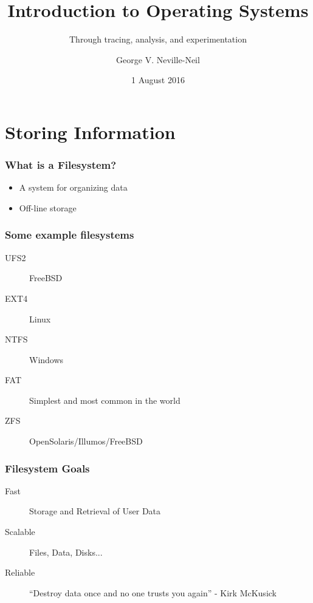\documentclass[pdftex]{beamer} %
\begin{document}

\title{Introduction to Operating Systems}
\subtitle{Through tracing, analysis, and experimentation}
\author{George V. Neville-Neil}
\date{1 August 2016}

\begin{frame}
  \titlepage
\end{frame}

\section{Storing Information}
\label{sec:storage}

\begin{frame}
  \frametitle{What is a Filesystem?}
  \begin{itemize}
  \item A system for organizing data
  \item Off-line storage
  \end{itemize}
\end{frame}

\begin{frame}
  \frametitle{Some example filesystems}
  \begin{description}
  \item[UFS2] FreeBSD
    \pause
    
  \item[EXT4] Linux
    
    \pause
    
  \item[NTFS] Windows

    \pause

  \item[FAT] Simplest and most common in the world

    \pause

  \item[ZFS] OpenSolaris/Illumos/FreeBSD
  \end{description}
\end{frame}

\begin{frame}
  \frametitle{Filesystem Goals}
  \begin{description}
  \item [Fast] Storage and Retrieval of User Data

    \pause

  \item [Scalable] Files, Data, Disks...

    \pause
    
  \item[Reliable] ``Destroy data once and no one trusts you again'' -
    Kirk McKusick
  \end{description}
\end{frame}
\end{document}
